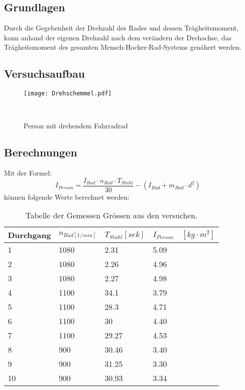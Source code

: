 \documentclass{article}
\begin{document}
\subsection{Grundlagen}
Durch die Gegebenheit der Drehzahl des Rades und dessen Trägheitsmoment, kann anhand der eigenen
Drehzahl nach dem verändern der Drehachse, das Trägheitsmoment des gesamten 
Mensch-Hocker-Rad-Systems genähert werden.

\subsection{Versuchsaufbau}
\begin{figure}[h]
\center

\texttt{[image: Drehschemmel.pdf]} 
\caption{Person mit drehendem Fahrradrad}
\

\end{figure}

\subsection{Berechnungen}
Mit der Formel:
\begin{equation}
I_{Person}=\frac{I_{Rad}\cdot n_{Rad}\cdot T_{Stuhl}}{30}-(I_{Rad}+m_{Rad}\cdot d^2)
\end{equation}
können folgende Werte berechnet werden:
\begin{table}[H]
   \center
    \begin{tabular}{|l|l|l|l|}
        \hline
     
        Durchgang & $n_{Rad[1/min]}$ & $T_{Stuhl}[sek]$ & $I_{Person}\quad [kg\cdot m^2]$ \\ \hline
        1         & 1080         & 2.31    & 5.09      \\ 
        2         & 1080         & 2.26    & 4.96       \\ 
        3         & 1080         & 2.27    & 4.98        \\ 
        4         & 1100         & 34.1    & 3.79        \\ 
        5         & 1100         & 28.3    & 4.71        \\ 
        6         & 1100         & 30      & 4.40        \\ 
        7         & 1100         & 29.27   & 4.53        \\ 
        8         & 900          & 30.46   & 3.40        \\ 
        9         & 900          & 31.25   & 3.30        \\ 
        10        & 900          & 30.93   & 3.34        \\
        \hline
    \end{tabular}
    \caption{Tabelle der Gemessen Grössen aus den versuchen.}
\end{table}
\end{document}
